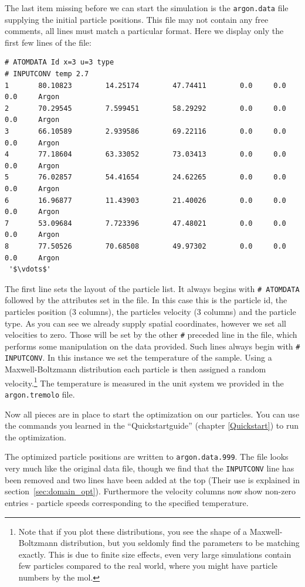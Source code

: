 \bigbreak
The last item missing before we can start the simulation is the \texttt{argon.data} file supplying the initial particle positions. This file may not contain any free comments, all lines must match a particular format. Here we display only the first few lines of the file:
\begin{lstlisting}[escapechar=']
# ATOMDATA Id x=3 u=3 type
# INPUTCONV temp 2.7
1       80.10823        14.25174        47.74411        0.0     0.0     0.0     Argon
2       70.29545        7.599451        58.29292        0.0     0.0     0.0     Argon
3       66.10589        2.939586        69.22116        0.0     0.0     0.0     Argon
4       77.18604        63.33052        73.03413        0.0     0.0     0.0     Argon
5       76.02857        54.41654        24.62265        0.0     0.0     0.0     Argon
6       16.96877        11.43903        21.40026        0.0     0.0     0.0     Argon
7       53.09684        7.723396        47.48021        0.0     0.0     0.0     Argon
8       77.50526        70.68508        49.97302        0.0     0.0     0.0     Argon
 '$\vdots$'
\end{lstlisting}
The first line sets the layout of the particle list. It always begins with
\texttt{\# ATOMDATA} followed by the attributes set in the file. In this case
this is the particle id, the particles position (3 columns), the particles
velocity (3 columns) and the particle type. As you can see we already supply
spatial coordinates, however we set all velocities to zero. Those will be set
by the other \texttt{\#} preceded line in the file, which performs some
manipulation on the data provided. Such lines always begin with \texttt{\# INPUTCONV}.
In this instance we set the temperature of the sample. Using a Maxwell-Boltzmann distribution
each particle is then assigned a random velocity.\footnote{Note that if you plot these
distributions, you see the shape of a Maxwell-Boltzmann distribution, but you seldomly
find the parameters to be matching exactly. This is due to finite size effects, even
very large simulations contain few particles compared to the real world, where you
might have particle numbers by the mol.} The
temperature is measured in the unit system we provided in the \texttt{argon.tremolo} file.

Now all pieces are in place to start the optimization on our particles.
You can use the commands you learned in the ``Quickstartguide'' (chapter \ref{Quickstart}) to run the optimization.

The optimized particle positions are written to \texttt{argon.data.999}. 
The file looks very much like the original data file, though we find that
the \texttt{INPUTCONV} line has been removed and two lines have been added
at the top (Their use is explained in section~\ref{sec:domain_opt}). Furthermore the velocity columns now show non-zero entries -
particle speeds corresponding to the specified temperature.

